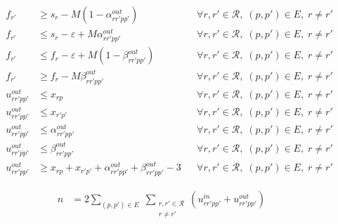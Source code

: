 \begin{align}
f_{r'} &\ge s_r - M \left( 1 - \alpha^{out}_{rr'pp'} \right)
&& \forall r,r' \in \mathcal{R},\; (p,p') \in E,\; r \neq r' \\
f_{r'} &\le s_r - \varepsilon + M \alpha^{out}_{rr'pp'}
&& \forall r,r' \in \mathcal{R},\; (p,p') \in E,\; r \neq r' \\
f_{r'} &\le f_r - \varepsilon + M \left( 1 - \beta^{out}_{rr'pp'} \right)
&& \forall r,r' \in \mathcal{R},\; (p,p') \in E,\; r \neq r' \\
f_{r'} &\ge f_r - M \beta^{out}_{rr'pp'}
&& \forall r,r' \in \mathcal{R},\; (p,p') \in E,\; r \neq r' \\
u^{out}_{rr'pp'} &\le x_{rp}
&& \forall r,r' \in \mathcal{R},\; (p,p') \in E,\; r \neq r' \\
u^{out}_{rr'pp'} &\le x_{r'p'}
&& \forall r,r' \in \mathcal{R},\; (p,p') \in E,\; r \neq r' \\
u^{out}_{rr'pp'} &\le \alpha^{out}_{rr'pp'}
&& \forall r,r' \in \mathcal{R},\; (p,p') \in E,\; r \neq r' \\
u^{out}_{rr'pp'} &\le \beta^{out}_{rr'pp'}
&& \forall r,r' \in \mathcal{R},\; (p,p') \in E,\; r \neq r' \\
u^{out}_{rr'pp'} &\ge x_{rp} + x_{r'p'} + \alpha^{out}_{rr'pp'} + \beta^{out}_{rr'pp'} - 3
&& \forall r,r' \in \mathcal{R},\; (p,p') \in E,\; r \neq r'
\end{align}

\begin{align}
n &= 2 \sum_{(p,p')\in E}\;
\sum_{\substack{r,r' \in \mathcal{R}\\ r \neq r'}}
\left( u^{in}_{rr'pp'} + u^{out}_{rr'pp'} \right)
&&
\end{align}




